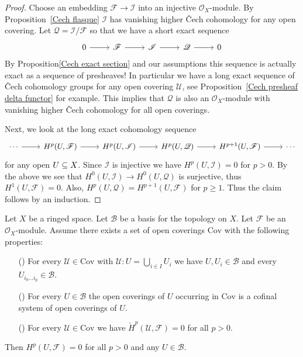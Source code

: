 \begin{proof}
Choose an embedding $\mathscr{F}\to\mathscr{I}$ into an injective $\mathscr{O}_X$-module. By Proposition~\ref{Cech flasque} $\mathscr{I}$ has vanishing higher \v{C}ech cohomology for any open covering. Let $\mathscr{Q}=\mathscr{I}/\mathscr{F}$ so that we have a short exact sequence
\[\begin{tikzcd}
0\ar[r]&\mathscr{F}\ar[r]&\mathscr{I}\ar[r]&\mathscr{Q}\ar[r]&0
\end{tikzcd}\]
By Proposition\ref{Cech exact section} and our assumptions this sequence is actually exact as a sequence of presheaves! In particular we have a long exact sequence of \v{C}ech cohomology groups for any open covering $\mathcal{U}$, see Proposition~\ref{Cech presheaf delta functor} for example. This implies that $\mathscr{Q}$ is also an $\mathscr{O}_X$-module with vanishing higher \v{C}ech cohomology for all open coverings.\par
Next, we look at the long exact cohomology sequence
\[\begin{tikzcd}
\cdots\ar[r]&H^p(U,\mathscr{F})\ar[r]&H^p(U,\mathscr{I})\ar[r]&H^p(U,\mathscr{Q})\ar[r]&H^{p+1}(U,\mathscr{F})\ar[r]&\cdots
\end{tikzcd}\]
for any open $U\subseteq X$. Since $\mathscr{I}$ is injective we have $H^p(U,\mathscr{I})=0$ for $p>0$. By the above we see that $H^0(U,\mathscr{I})\to H^0(U,\mathscr{Q})$ is surjective, thus $H^1(U,\mathscr{F})=0$. Also, $H^p(U,\mathscr{Q})=H^{p+1}(U,\mathscr{F})$ for $p\geq 1$. Thus the claim follows by an induction.
\end{proof}
\begin{proposition}
Let $X$ be a ringed space. Let $\mathcal{B}$ be a basis for the topology on $X$. Let $\mathscr{F}$ be an $\mathscr{O}_X$-module. Assume there exists a set of open coverings $\mathrm{Cov}$ with the following properties:
\begin{itemize}
\item[(\rmnum{1})] For every $\mathcal{U}\in\mathrm{Cov}$ with $\mathcal{U}:U=\bigcup_{i\in I}U_i$ we have $U,U_i\in\mathcal{B}$ and every $U_{i_0\dots i_p}\in\mathcal{B}$.
\item[(\rmnum{2})] For every $U\in\mathcal{B}$ the open coverings of $U$ occurring in $\mathrm{Cov}$ is a cofinal system of open coverings of $U$.
\item[(\rmnum{3})] For every $\mathcal{U}\in\mathrm{Cov}$ we have $\check{H}^p(\mathcal{U},\mathscr{F})=0$ for all $p>0$.
\end{itemize}
Then $H^p(U,\mathscr{F})=0$ for all $p>0$ and any $U\in\mathcal{B}$.
\end{proposition}
